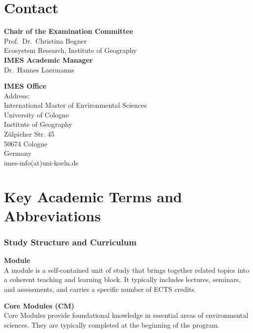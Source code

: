 \documentclass[
  letterpaper,
  10pt,
  openany]{book}
\begin{document}
\chapter*{Contact}\label{contact}


\textbf{Chair of the Examination Committee}\\
Prof.~Dr.~Christina Bogner\\
Ecosystem Research, Institute of Geography\\

\textbf{IMES Academic Manager}\\
Dr.~Hannes Laermanns

\textbf{IMES Office}\\
Address:\\
International Master of Environmental Sciences\\
University of Cologne\\
Institute of Geography\\
Zülpicher Str. 45\\
50674 Cologne\\
Germany\\
imes-info(at)uni-koeln.de


\chapter*{Key Academic Terms and Abbreviations}\label{sec-concepts}


\subsection*{Study Structure and
Curriculum}\label{study-structure-and-curriculum}

\textbf{Module}\\
A module is a self-contained unit of study that brings together related
topics into a coherent teaching and learning block. It typically
includes lectures, seminars, and assessments, and carries a specific
number of ECTS credits.

\textbf{Core Modules (CM)}\\
Core Modules provide foundational knowledge in essential areas of
environmental sciences. They are typically completed at the beginning of
the program.
\end{document}
